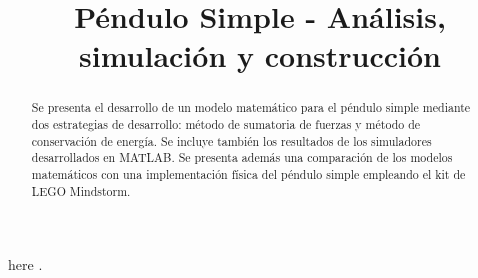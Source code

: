 \documentclass[journal, onecolumn]{IEEEtran}
\begin{document}
\title{
Péndulo Simple - Análisis, simulación y construcción\\
}


\author{
}

\maketitle

\begin{abstract}



Se presenta el desarrollo de un modelo matemático
para el péndulo simple mediante dos estrategias de desarrollo:
método de sumatoria de fuerzas y método de conservación de energía.
Se incluye también los resultados de los simuladores desarrollados 
en MATLAB.
Se presenta además una comparación de los modelos matemáticos 
con una implementación física del péndulo simple empleando el 
kit de LEGO Mindstorm.

\end{abstract}










here \cite{susskind}.%



\end{document}
